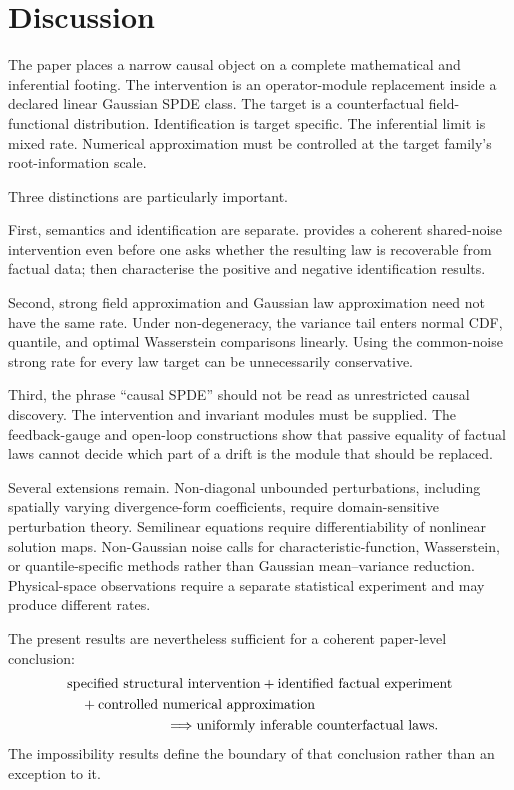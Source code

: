 \section{Discussion}

The paper places a narrow causal object on a complete mathematical and inferential footing. The intervention is an operator-module replacement inside a declared linear Gaussian SPDE class. The target is a counterfactual field-functional distribution. Identification is target specific. The inferential limit is mixed rate. Numerical approximation must be controlled at the target family's root-information scale.

Three distinctions are particularly important.

First, semantics and identification are separate.  provides a coherent shared-noise intervention even before one asks whether the resulting law is recoverable from factual data;  then characterise the positive and negative identification results.

Second, strong field approximation and Gaussian law approximation need not have the same rate. Under non-degeneracy, the variance tail enters normal CDF, quantile, and optimal Wasserstein comparisons linearly. Using the common-noise strong rate for every law target can be unnecessarily conservative.

Third, the phrase ``causal SPDE'' should not be read as unrestricted causal discovery. The intervention and invariant modules must be supplied. The feedback-gauge and open-loop constructions show that passive equality of factual laws cannot decide which part of a drift is the module that should be replaced.

Several extensions remain. Non-diagonal unbounded perturbations, including spatially varying divergence-form coefficients, require domain-sensitive perturbation theory. Semilinear equations require differentiability of nonlinear solution maps. Non-Gaussian noise calls for characteristic-function, Wasserstein, or quantile-specific methods rather than Gaussian mean--variance reduction. Physical-space observations require a separate statistical experiment and may produce different rates.

The present results are nevertheless sufficient for a coherent paper-level conclusion:
\begin{equation*}
\begin{aligned}
&\text{specified structural intervention}
+\text{identified factual experiment}\\
&\quad+\text{controlled numerical approximation}\\
&\hspace{2.5cm}\Longrightarrow
\text{uniformly inferable counterfactual laws}.
\end{aligned}
\end{equation*}
The impossibility results define the boundary of that conclusion rather than an exception to it.
